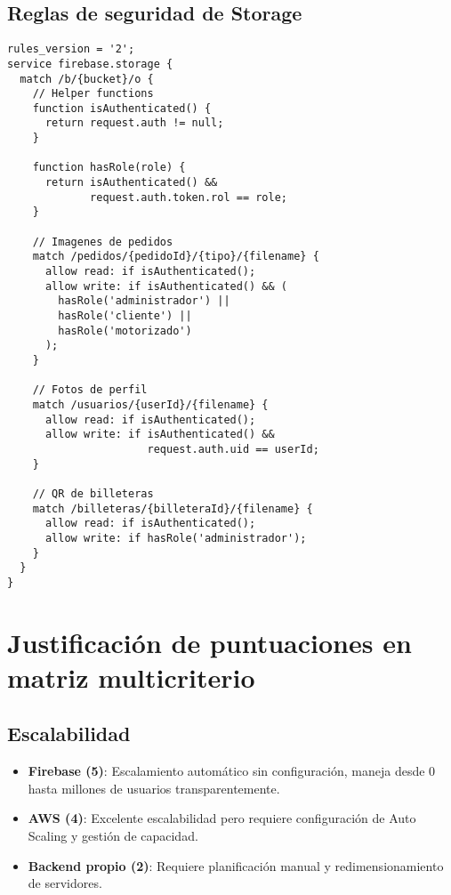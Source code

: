 \section{Reglas de seguridad de Storage}

\begin{lstlisting}[caption={Firebase Storage Security Rules}]
rules_version = '2';
service firebase.storage {
  match /b/{bucket}/o {
    // Helper functions
    function isAuthenticated() {
      return request.auth != null;
    }
    
    function hasRole(role) {
      return isAuthenticated() && 
             request.auth.token.rol == role;
    }
    
    // Imagenes de pedidos
    match /pedidos/{pedidoId}/{tipo}/{filename} {
      allow read: if isAuthenticated();
      allow write: if isAuthenticated() && (
        hasRole('administrador') ||
        hasRole('cliente') ||
        hasRole('motorizado')
      );
    }
    
    // Fotos de perfil
    match /usuarios/{userId}/{filename} {
      allow read: if isAuthenticated();
      allow write: if isAuthenticated() && 
                      request.auth.uid == userId;
    }
    
    // QR de billeteras
    match /billeteras/{billeteraId}/{filename} {
      allow read: if isAuthenticated();
      allow write: if hasRole('administrador');
    }
  }
}
\end{lstlisting}

\chapter{Justificación de puntuaciones en matriz multicriterio}
\label{anexo:justificacion-puntuaciones}

\section{Escalabilidad}

\begin{itemize}
    \item \textbf{Firebase (5)}: Escalamiento automático sin configuración, maneja desde 0 hasta millones de usuarios transparentemente.
    
    \item \textbf{AWS (4)}: Excelente escalabilidad pero requiere configuración de Auto Scaling y gestión de capacidad.
    
    \item \textbf{Backend propio (2)}: Requiere planificación manual y redimensionamiento de servidores.
\end{itemize}

